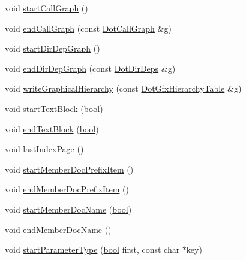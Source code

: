 \begin{DoxyCompactItemize}
\item 
void \hyperlink{class_html_generator_ad02b96924b42a2f2ac3e511dbbb587c2}{start\+Call\+Graph} ()
\item 
void \hyperlink{class_html_generator_a7a304cc5507fac3e1501a5d442c70157}{end\+Call\+Graph} (const \hyperlink{class_dot_call_graph}{Dot\+Call\+Graph} \&\hyperlink{060__command__switch_8tcl_af08b4b5bfa9edf0b0a7dee1c2b2c29e0}{g})
\item 
void \hyperlink{class_html_generator_ae98ba8c8ff63e688bc33af4114507335}{start\+Dir\+Dep\+Graph} ()
\item 
void \hyperlink{class_html_generator_a6b8ce5266f910a0bec4fc48a41c35f49}{end\+Dir\+Dep\+Graph} (const \hyperlink{class_dot_dir_deps}{Dot\+Dir\+Deps} \&\hyperlink{060__command__switch_8tcl_af08b4b5bfa9edf0b0a7dee1c2b2c29e0}{g})
\item 
void \hyperlink{class_html_generator_aa3618ecfc5f53f11a7f26bd4bb6d432f}{write\+Graphical\+Hierarchy} (const \hyperlink{class_dot_gfx_hierarchy_table}{Dot\+Gfx\+Hierarchy\+Table} \&\hyperlink{060__command__switch_8tcl_af08b4b5bfa9edf0b0a7dee1c2b2c29e0}{g})
\item 
void \hyperlink{class_html_generator_ad3b0577be9211daec92334e0969b7530}{start\+Text\+Block} (\hyperlink{qglobal_8h_a1062901a7428fdd9c7f180f5e01ea056}{bool})
\item 
void \hyperlink{class_html_generator_a10c142119a0926773b499872108305db}{end\+Text\+Block} (\hyperlink{qglobal_8h_a1062901a7428fdd9c7f180f5e01ea056}{bool})
\item 
void \hyperlink{class_html_generator_a91b2b5d349350e74a92c1c51ff9eec8f}{last\+Index\+Page} ()
\item 
void \hyperlink{class_html_generator_aafaa04b511a0cf5281d58f7700bf0c09}{start\+Member\+Doc\+Prefix\+Item} ()
\item 
void \hyperlink{class_html_generator_a0cacf6a5a55ada9f6f8688e06ce831b7}{end\+Member\+Doc\+Prefix\+Item} ()
\item 
void \hyperlink{class_html_generator_a9067c50404d75e969e8463bc4dbb98a5}{start\+Member\+Doc\+Name} (\hyperlink{qglobal_8h_a1062901a7428fdd9c7f180f5e01ea056}{bool})
\item 
void \hyperlink{class_html_generator_a4b86a0067f27e69bbfedd0d97e6eb3d9}{end\+Member\+Doc\+Name} ()
\item 
void \hyperlink{class_html_generator_abff728b4734da738d2e0deb552efce08}{start\+Parameter\+Type} (\hyperlink{qglobal_8h_a1062901a7428fdd9c7f180f5e01ea056}{bool} first, const char $\ast$key)
\item 

\end{DoxyCompactItemize}
